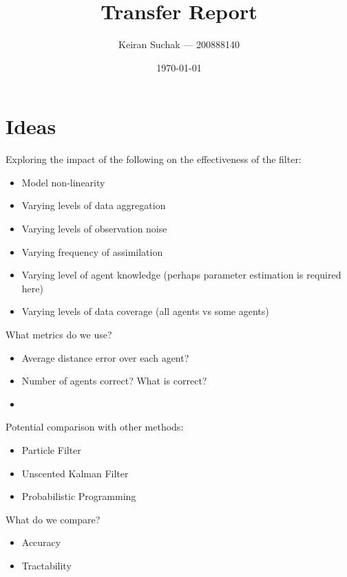 \documentclass[a4paper, 11pt]{article}
\begin{document}
\title{Transfer Report}
\author{Keiran Suchak --- 200888140}
\date{\today}
\maketitle

\tableofcontents

\newpage

\section*{Ideas}\label{sec:ideas}

Exploring the impact of the following on the effectiveness of the filter:
\begin{itemize}
    \item Model non-linearity
    \item Varying levels of data aggregation
    \item Varying levels of observation noise
    \item Varying frequency of assimilation
    \item Varying level of agent knowledge (perhaps parameter estimation is
        required here)
    \item Varying levels of data coverage (all agents vs some agents)
\end{itemize}

What metrics do we use?
\begin{itemize}
    \item Average distance error over each agent?
    \item Number of agents correct? What is correct?
    \item 
\end{itemize}

Potential comparison with other methods:
\begin{itemize}
    \item Particle Filter
    \item Unscented Kalman Filter
    \item Probabilistic Programming
\end{itemize}

What do we compare?
\begin{itemize}
    \item Accuracy
    \item Tractability
\end{itemize}















%

%



\end{document}
